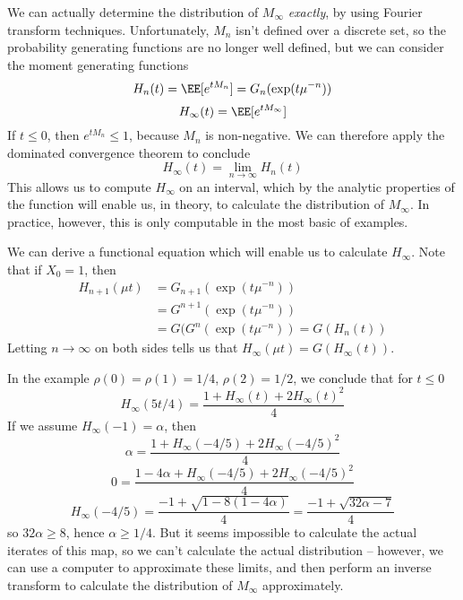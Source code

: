 We can actually determine the distribution of $M_\infty$ {\it exactly}, by using Fourier transform techniques. Unfortunately, $M_n$ isn't defined over a discrete set, so the probability generating functions are no longer well defined, but we can consider the moment generating functions
%
\[ H_n(t) = \EE[e^{tM_n}] = G_n(\exp(t \mu^{-n})) \]
\[ H_\infty(t) = \EE[e^{tM_\infty}] \]
%
If $t \leq 0$, then $e^{tM_n} \leq 1$, because $M_n$ is non-negative. We can therefore apply the dominated convergence theorem to conclude
%
\[ H_\infty(t) = \lim_{n \to \infty} H_n(t) \]
%
This allows us to compute $H_\infty$ on an interval, which by the analytic properties of the function will enable us, in theory, to calculate the distribution of $M_\infty$. In practice, however, this is only computable in the most basic of examples.

We can derive a functional equation which will enable us to calculate $H_\infty$. Note that if $X_0 = 1$, then
%
\begin{align*}
    H_{n+1}(\mu t) &= G_{n+1}(\exp(t \mu^{-n}))\\
    &= G^{n+1}(\exp(t \mu^{-n}))\\
    &= G(G^n(\exp(t \mu^{-n})) = G(H_n(t))
\end{align*}
%
Letting $n \to \infty$ on both sides tells us that $H_\infty(\mu t) = G(H_\infty(t))$.

\begin{example}
    In the example $\rho(0) = \rho(1) = 1/4$, $\rho(2) = 1/2$, we conclude that for $t \leq 0$
    \[ H_\infty(5t/4) = \frac{1 + H_\infty(t) + 2 H_\infty(t)^2}{4} \]
    If we assume $H_\infty(-1) = \alpha$, then
    \[ \alpha = \frac{1 + H_\infty(-4/5) + 2H_\infty(-4/5)^2}{4} \]
    \[ 0 = \frac{1 - 4\alpha + H_\infty(-4/5) + 2H_\infty(-4/5)^2}{4} \]
    \[ H_\infty(-4/5) = \frac{-1 + \sqrt{1 - 8(1 - 4\alpha)}}{4} = \frac{-1 + \sqrt{32\alpha - 7}}{4} \]
    so $32\alpha \geq 8$, hence $\alpha \geq 1/4$. But it seems impossible to calculate the actual iterates of this map, so we can't calculate the actual distribution -- however, we can use a computer to approximate these limits, and then perform an inverse transform to calculate the distribution of $M_\infty$ approximately.
\end{example}

